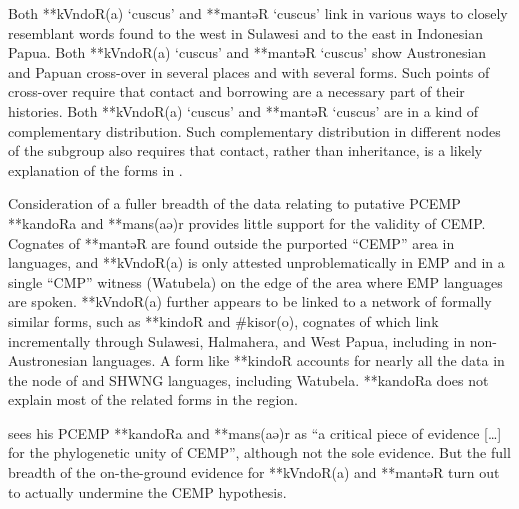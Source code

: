 Both **kVndoR(a) ‘cuscus’
and **mantəR ‘cuscus’ link in various ways to closely resemblant
words found to the west in Sulawesi
and to the east in Indonesian Papua.
Both **kVndoR(a) ‘cuscus’ and **mantəR ‘cuscus’ show Austronesian
and Papuan cross-over in several places
and with several forms.
Such points of cross-over require that contact
and borrowing are a necessary part of their histories.
Both **kVndoR(a) ‘cuscus’ and **mantəR ‘cuscus’ are in a kind of complementary distribution.
Such complementary distribution in different nodes of the 
subgroup also requires that contact,
rather than inheritance, is a likely explanation of the forms in .

Consideration of a fuller breadth of the data relating to putative
PCEMP **kandoRa and **mans(aə)r provides little support for the validity of CEMP.
Cognates of **mantəR are found outside the purported “CEMP” area in 
languages, and **kVndoR(a) is only attested unproblematically in EMP
and in a single “CMP” witness (Watubela) on the edge of the area
where EMP languages are spoken.
**kVndoR(a) further appears to be linked to a network of formally
similar forms, such as **kindoR and {\#}kisor(o), cognates of which link incrementally
through Sulawesi, Halmahera, and West Papua, including in non-Austronesian languages.
A form like **kindoR accounts for nearly all the data in the
 node of 
and SHWNG languages, including Watubela.
**kandoRa does not explain most of the related forms in the region.

\citet[262]{Blust2012b} sees his PCEMP
**kandoRa and **mans(aə)r as “a critical piece of evidence [{\ldots}]
for the phylogenetic unity of CEMP”,
although not the sole evidence.
But the full breadth of the on-the-ground evidence for **kVndoR(a)
and **mantəR turn out to actually undermine the CEMP hypothesis.
